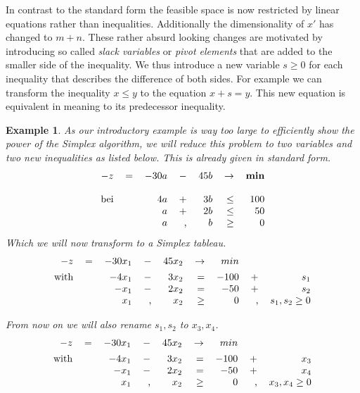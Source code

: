\documentclass[a4paper, 11pt]{article}
\newtheorem{example}{Example}
\begin{document}
In contrast to the standard form the feasible space is now restricted by linear equations rather than inequalities. Additionally the dimensionality of $x'$ has changed to $m+n$. These rather absurd looking changes are motivated by introducing so called \textit{slack variables} or \textit{pivot elements} that are added to the smaller side of the inequality. We thus introduce a new variable $s\geq 0$ for each inequality that describes the difference of both sides. For example we can transform the inequality $x\leq y$ to the equation $x + s=y$. This new equation is equivalent in meaning to its predecessor inequality.\\

\begin{example}
	As our introductory example is way too large to efficiently show the power of the Simplex algorithm, we will reduce this problem to two variables and two new inequalities as listed below. This is already given in standard form.\\
	
	\begin{equation}
		\begin{tabular}{rrrrrrr}
			$ -z $&$=$& $-30a$ &$- $&$45b$ &$\rightarrow$& $\textbf{min}$ \\
			\\
			bei&&$4a$ &$+$&$3b$&$\leq$&$100$\\
			&&$a$ & $+$&$2b$&$\leq$&$50$\\
			&&$a$ & ,&$b$ &$\geq$&$0$
		\end{tabular}
	\end{equation}
	Which we will now transform to a Simplex tableau.
	\begin{equation}
		\begin{tabular}{rrrrrrrrr}
			$ -z $&$=$& $-30x_1$ &$-$&$45x_2$ &$\rightarrow$& \textbf{$min$}&& \vspace{0.15cm}\\
			with &&$-4x_1$ &$-$&$3x_2$&$=$&$-100$&$+$&$s_1$\\
			&&$-x_1$ & $-$&$2x_2$&$=$&$-50$&$+$&$s_2$\\
			&&$x_1$ &, &$x_2$&$\geq$&$0$ &,&$s_1, s_2 \geq 0$
		\end{tabular}
	\end{equation}

	From now on we will also rename $s_1,s_2$ to $x_3, x_4$.
	\begin{equation}
		\begin{tabular}{rrrrrrrrr}
			$ -z $&$=$& $-30x_1$ &$-$&$45x_2$ &$\rightarrow$& \textbf{$min$}&& \vspace{0.15cm}\\
			with &&$-4x_1$ &$-$&$3x_2$&$=$&$-100$&$+$&$x_3$\\
			&&$-x_1$ & $-$&$2x_2$&$=$&$-50$&$+$&$x_4$\\
			&&$x_1$ &, &$x_2$&$\geq$&$0$ &,&$x_3, x_4 \geq 0$
		\end{tabular}
	\end{equation}
\end{example}
\end{document}
